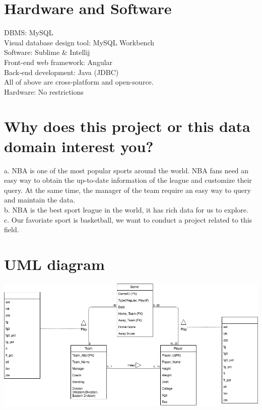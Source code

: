 \documentclass[a4paper,12pt]{article} %
\begin{document}
\section{Hardware and Software}
DBMS: MySQL\\[5pt]
Visual database design tool: MySQL Workbench\\[5pt]
Software: Sublime \& Intellij\\[5pt]
Front-end web framework: Angular\\[5pt]
Back-end development: Java (JDBC)\\[5pt]
All of above are cross-platform and open-source.\\[5pt]
Hardware: No restrictions
\section{Why does this project or this data domain interest you?}
a. NBA is one of the most popular sports around the world. NBA fans need an easy way to obtain 
the up-to-date information of the league and customize their query. 
At the same time, the manager of the team require an easy way to query and maintain the data. \\[5pt]
b. NBA is the best sport league in the world, it has rich data for us to explore.\\[5pt]
c. Our favoriate sport is basketball, we want to conduct a project related to this field.
\section{UML diagram}
\begin{center}
\includegraphics[width=1\textwidth]{NBA}
\end{center}
\end{document}
